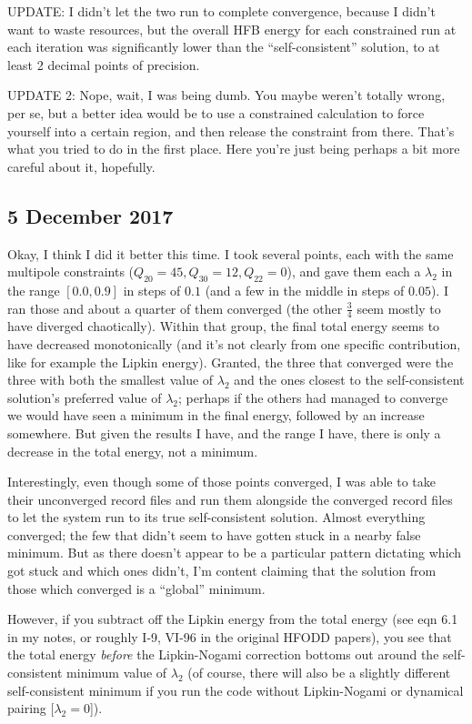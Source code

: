 \documentclass[]{report}
\begin{document}
UPDATE: I didn't let the two run to complete convergence, because I didn't want to waste resources, but the overall HFB energy for each constrained run at each iteration was significantly lower than the ``self-consistent'' solution, to at least 2 decimal points of precision.

UPDATE 2: Nope, wait, I was being dumb. You maybe weren't totally wrong, per se, but a better idea would be to use a constrained calculation to force yourself into a certain region, and then release the constraint from there. That's what you tried to do in the first place. Here you're just being perhaps a bit more careful about it, hopefully.

\subsection*{5 December 2017}
Okay, I think I did it better this time. I took several points, each with the same multipole constraints ($Q_{20}=45, Q_{30}=12, Q_{22}=0$), and gave them each a $\lambda_2$ in the range $[0.0, 0.9]$ in steps of $0.1$ (and a few in the middle in steps of $0.05$). I ran those and about a quarter of them converged (the other $\frac{3}{4}$ seem mostly to have diverged chaotically). Within that group, the final total energy seems to have decreased monotonically (and it's not clearly from one specific contribution, like for example the Lipkin energy). Granted, the three that converged were the three with both the smallest value of $\lambda_2$ and the ones closest to the self-consistent solution's preferred value of $\lambda_2$; perhaps if the others had managed to converge we would have seen a minimum in the final energy, followed by an increase somewhere. But given the results I have, and the range I have, there is only a decrease in the total energy, not a minimum.

Interestingly, even though some of those points converged, I was able to take their unconverged record files and run them alongside the converged record files to let the system run to its true self-consistent solution. Almost everything converged; the few that didn't seem to have gotten stuck in a nearby false minimum. But as there doesn't appear to be a particular pattern dictating which got stuck and which ones didn't, I'm content claiming that the solution from those which converged is a ``global'' minimum.

However, if you subtract off the Lipkin energy from the total energy (see eqn 6.1 in my notes, or roughly I-9, VI-96 in the original HFODD papers), you see that the total energy \textit{before} the Lipkin-Nogami correction bottoms out around the self-consistent minimum value of $\lambda_2$ (of course, there will also be a slightly different self-consistent minimum if you run the code without Lipkin-Nogami or dynamical pairing [$\lambda_2=0$]).
\end{document}
